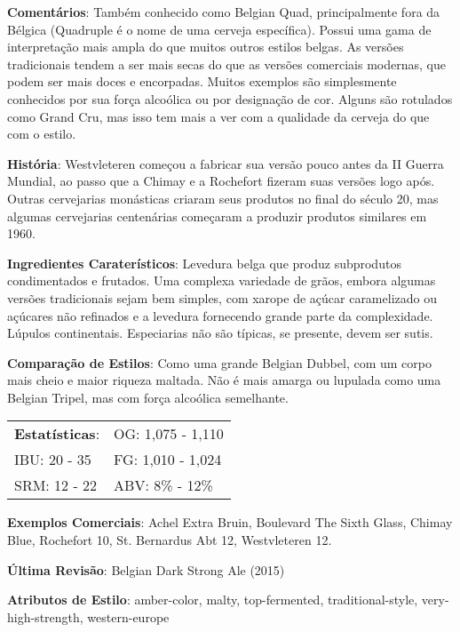 \textbf{Comentários}: Também conhecido como Belgian Quad, principalmente fora da Bélgica (Quadruple é o nome de uma cerveja específica). Possui uma gama de interpretação mais ampla do que muitos outros estilos belgas. As versões tradicionais tendem a ser mais secas do que as versões comerciais modernas, que podem ser mais doces e encorpadas. Muitos exemplos são simplesmente conhecidos por sua força alcoólica ou por designação de cor. Alguns são rotulados como Grand Cru, mas isso tem mais a ver com a qualidade da cerveja do que com o estilo.

\textbf{História}: Westvleteren começou a fabricar sua versão pouco antes da II Guerra Mundial, ao passo que a Chimay e a Rochefort fizeram suas versões logo após. Outras cervejarias monásticas criaram seus produtos no final do século 20, mas algumas cervejarias centenárias começaram a produzir produtos similares em 1960.

\textbf{Ingredientes Caraterísticos}: Levedura belga que produz subprodutos condimentados e frutados. Uma complexa variedade de grãos, embora algumas versões tradicionais sejam bem simples, com xarope de açúcar caramelizado ou açúcares não refinados e a levedura fornecendo grande parte da complexidade. Lúpulos continentais. Especiarias não são típicas, se presente, devem ser sutis.

\textbf{Comparação de Estilos}: Como uma grande Belgian Dubbel, com um corpo mais cheio e maior riqueza maltada. Não é mais amarga ou lupulada como uma Belgian Tripel, mas com força alcoólica semelhante.

\begin{tabular}{@{}p{35mm}p{35mm}@{}}
  \textbf{Estatísticas}: & OG: 1,075 - 1,110 \\
  IBU: 20 - 35  & FG: 1,010 - 1,024  \\
  SRM: 12 - 22  & ABV: 8\% - 12\%
\end{tabular}

\textbf{Exemplos Comerciais}: Achel Extra Bruin, Boulevard The Sixth Glass, Chimay Blue, Rochefort 10, St. Bernardus Abt 12, Westvleteren 12.

\textbf{Última Revisão}: Belgian Dark Strong Ale (2015)

\textbf{Atributos de Estilo}: amber-color, malty, top-fermented, traditional-style, very-high-strength, western-europe
